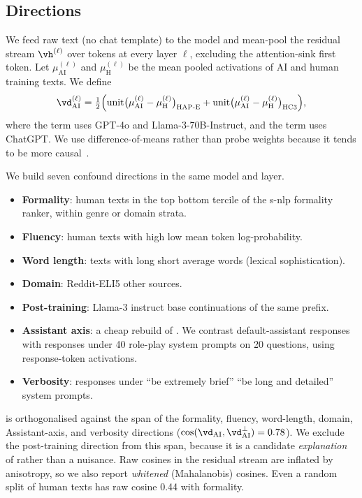 \subsection{Directions}
We feed raw text (no chat template) to the model and mean-pool the residual stream $\vh^{(\ell)}$ over tokens at every layer $\ell$, excluding the attention-sink first token. Let $\mu^{(\ell)}_{\text{AI}}$ and $\mu^{(\ell)}_{\text{H}}$ be the mean pooled activations of AI and human training texts. We define
\begin{equation}
\dai^{(\ell)} = \tfrac{1}{2}\Big(\mathrm{unit}\big(\mu^{(\ell)}_{\text{AI}}-\mu^{(\ell)}_{\text{H}}\big)_{\text{\hape}} + \mathrm{unit}\big(\mu^{(\ell)}_{\text{AI}}-\mu^{(\ell)}_{\text{H}}\big)_{\text{\hcthree}}\Big),
\end{equation}
where the \hape term uses GPT-4o and Llama-3-70B-Instruct, and the \hcthree term uses ChatGPT. We use difference-of-means rather than probe weights because it tends to be more causal~\citep{marks2024geometry}.

 We build seven confound directions in the same model and layer.
\begin{itemize}[leftmargin=*,itemsep=0pt,topsep=0pt]
    \item {\bf Formality}: human texts in the top \versus bottom tercile of the s-nlp formality ranker, within genre or domain strata.
    \item {\bf Fluency}: human texts with high \versus low mean token log-probability.
    \item {\bf Word length}: texts with long \versus short average words (lexical sophistication).
    \item {\bf Domain}: \hcthree Reddit-ELI5 \versus other sources.
    \item {\bf Post-training}: Llama-3 instruct \versus base continuations of the same \hape prefix.
    \item {\bf Assistant axis}: a cheap rebuild of \citet{lu2026assistant}. We contrast default-assistant responses with responses under 40 role-play system prompts on 20 questions, using response-token activations.
    \item {\bf Verbosity}: responses under ``be extremely brief'' \versus ``be long and detailed'' system prompts.
\end{itemize}
\daiperp is \dai orthogonalised against the span of the formality, fluency, word-length, domain, Assistant-axis, and verbosity directions ($\cos(\dai,\daiperp)=0.78$). We exclude the post-training direction from this span, because it is a candidate \emph{explanation} of \dai rather than a nuisance.
Raw cosines in the residual stream are inflated by anisotropy, so we also report \emph{whitened} (Mahalanobis) cosines. Even a random split of human texts has raw cosine 0.44 with formality.

